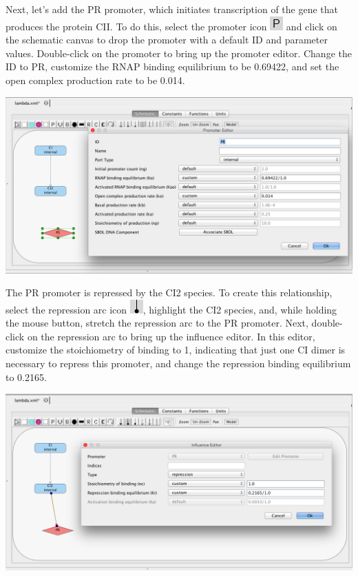 \documentclass[titlepage,11pt]{article}
\begin{document}
Next, let's add the PR promoter, which initiates transcription of the gene that produces the protein CII.  To do this, select the promoter icon \includegraphics{../gui/icons/modelview/promoter_mode_selected} and click on the schematic canvas to drop the promoter with a default ID and parameter values.  Double-click on the promoter to bring up the promoter editor.  Change the ID to PR, customize the RNAP binding equilibrium to be 0.69422, and set the open complex production rate to be 0.014. 
 
\begin{center}
\includegraphics[width=160mm]{screenshots/promoter} 
\end{center}

The PR promoter is repressed by the CI2 species.  To create this relationship, select the repression arc icon 
\includegraphics{../gui/icons/modelview/inhibition_selected}, highlight the CI2 species, and, while holding the mouse button, stretch the repression arc to the PR promoter.  Next, double-click on the repression arc to bring up the influence editor.  In this editor, customize the stoichiometry of binding to 1, indicating that just one CI dimer is necessary to repress this promoter, and change the repression binding equilibrium to 0.2165.

\begin{center}
\includegraphics[width=160mm]{screenshots/repression} 
\end{center}
\end{document}
